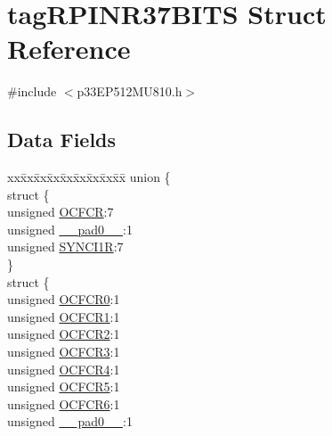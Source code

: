 \hypertarget{structtag_r_p_i_n_r37_b_i_t_s}{}\section{tag\+R\+P\+I\+N\+R37\+B\+I\+TS Struct Reference}
\label{structtag_r_p_i_n_r37_b_i_t_s}


{\ttfamily \#include $<$p33\+E\+P512\+M\+U810.\+h$>$}

\subsection*{Data Fields}
\begin{DoxyCompactItemize}
\item 
\begin{tabbing}
xx\=xx\=xx\=xx\=xx\=xx\=xx\=xx\=xx\=\kill
union \{\\
\>struct \{\\
\>\>unsigned \hyperlink{structtag_r_p_i_n_r37_b_i_t_s_abf02a78dc1829c5365bc6885e144e47b}{OCFCR}:7\\
\>\>unsigned \hyperlink{structtag_r_p_i_n_r37_b_i_t_s_adf71f3d8410c1f1dbbc96680a92c49af}{\_\_pad0\_\_}:1\\
\>\>unsigned \hyperlink{structtag_r_p_i_n_r37_b_i_t_s_a0e15a59887b328ec4a4d5677e7474967}{SYNCI1R}:7\\
\>\} \\
\>struct \{\\
\>\>unsigned \hyperlink{structtag_r_p_i_n_r37_b_i_t_s_acd9fecfa0d669fb0845a8225d91688ec}{OCFCR0}:1\\
\>\>unsigned \hyperlink{structtag_r_p_i_n_r37_b_i_t_s_aedb554965c4b92f5aa7c2942e4d042b5}{OCFCR1}:1\\
\>\>unsigned \hyperlink{structtag_r_p_i_n_r37_b_i_t_s_adb0c875cb2ecd263a5d5473102285786}{OCFCR2}:1\\
\>\>unsigned \hyperlink{structtag_r_p_i_n_r37_b_i_t_s_a2b4c8ece00df7f283a528e4e69e3f134}{OCFCR3}:1\\
\>\>unsigned \hyperlink{structtag_r_p_i_n_r37_b_i_t_s_a7ee2eee20c18151b1f2378da2bd4d07c}{OCFCR4}:1\\
\>\>unsigned \hyperlink{structtag_r_p_i_n_r37_b_i_t_s_a0f2aeafd498725d33f1e9905423be53b}{OCFCR5}:1\\
\>\>unsigned \hyperlink{structtag_r_p_i_n_r37_b_i_t_s_a7b9f165d8b30685f1d81035761aa3149}{OCFCR6}:1\\
\>\>unsigned \hyperlink{structtag_r_p_i_n_r37_b_i_t_s_adf71f3d8410c1f1dbbc96680a92c49af}{\_\_pad0\_\_}:1\\

\end{tabbing}
\end{DoxyCompactItemize}
